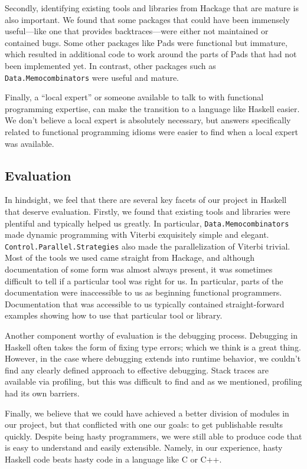 \documentclass[preprint,nonatbib,blockstyle,nocopyrightspace,times]{sigplanconf}
\begin{document}
Secondly, identifying existing tools and libraries from Hackage that are mature 
is also important.
We found that some packages that could have been immensely useful---like one 
that provides backtraces---were either not maintained or contained bugs.
Some other packages like Pads were functional but immature, which resulted in 
additional code to work around the parts of Pads that had not been implemented 
yet. 
In contrast, other packages such as \texttt{Data.Memocombinators} were
useful and mature.

Finally, a ``local expert'' or someone available to talk to with functional 
programming expertise, can make the transition to a language like Haskell 
easier.
We don't believe a local expert is absolutely necessary, but answers 
specifically related to functional programming idioms were easier to find when 
a local expert was available.


\subsection{Evaluation}
In hindsight, we feel that there are several key facets of our project in 
Haskell that deserve evaluation.
Firstly, we found that existing tools and libraries were plentiful and 
typically helped us greatly.
In particular, \texttt{Data.Memocombinators} made dynamic 
programming with Viterbi exquisitely simple and elegant.
\texttt{Control.Parallel.Strategies} also made the parallelization of Viterbi trivial.
Most of the tools we used came straight from Hackage, and although 
documentation of some form was almost always present, it was sometimes 
difficult to tell if a particular tool was right for us.
In particular, parts of the documentation were inaccessible to us as beginning 
functional programmers.
Documentation that was accessible to us typically contained straight-forward 
examples showing how to use that particular tool or library.

Another component worthy of evaluation is the debugging process.
Debugging in Haskell often takes the form of fixing type errors; which we think 
is a great thing.
However, in the case where debugging extends into runtime behavior, we couldn't 
find any clearly defined approach to effective debugging.
Stack traces are available via profiling, but this was difficult to find and 
as we mentioned, profiling had its own barriers.

Finally, we believe that we could have achieved a better division of modules in 
our project, but that conflicted with one our goals: to get publishable results
quickly. Despite being hasty programmers, we were still able to produce code 
that is easy to understand and easily extensible. Namely, in our experience, 
hasty Haskell code beats hasty code in a language like C or C++.
\end{document}
